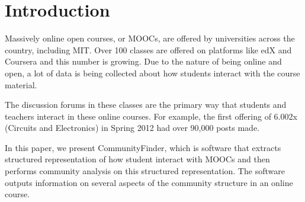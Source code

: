 \section{Introduction}
Massively online open courses, or MOOCs, are offered by universities across the country, including MIT. Over 100 classes are offered on platforms like edX and Coursera and this number is growing. Due to the nature of being online and open, a lot of data is being collected about how students interact with the course material.

The discussion forums in these classes are the primary way that students and teachers interact in these online courses. For example, the first offering of 6.002x  (Circuits and Electronics) in Spring 2012 had over 90,000 posts made.

In this paper, we present CommunityFinder, which is software that extracts structured representation of how student interact with MOOCs and then performs community analysis on this structured representation. The software outputs information on several aspects of the community structure in an online course.
